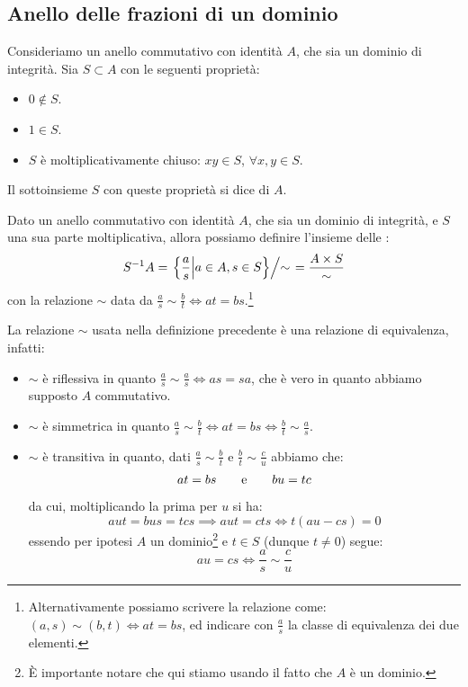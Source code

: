 \documentclass[11pt]{scrartcl}
\begin{document}
\newpage
\subsection{Anello delle frazioni di un dominio}

\begin{definition}
    Consideriamo un anello commutativo con identità $A$, che sia un dominio di integrità. Sia $S \subset A$ con le seguenti proprietà:
    \begin{itemize}
        \item $0 \not\in S$.
        \item $1 \in S$.
        \item $S$ è moltiplicativamente chiuso: $xy \in S$, $\forall x,y \in S$.
    \end{itemize}
    Il sottoinsieme $S$ con queste proprietà si dice  di $A$.
\end{definition}

\begin{definition}
    Dato un anello commutativo con identità $A$, che sia un dominio di integrità, e $S$ una sua parte moltiplicativa, allora possiamo definire l'insieme delle :
    \[ S^{-1}A = \left.\left\{\frac{a}{s} \middle| a\in A, s \in S\right\} \middle/ \sim \right. = \frac{A \times S}{\sim}
        \]
    con la relazione $\sim$ data da $\displaystyle\frac{a}{s} \sim \frac{b}{t} \iff at = bs$.\footnote{Alternativamente possiamo scrivere la relazione come: $(a,s) \sim (b,t) \iff at = bs$, ed indicare con $\displaystyle\frac{a}{s}$ la classe di equivalenza dei due elementi.}
\end{definition}

\begin{remark}
    La relazione $\sim$ usata nella definizione precedente è una relazione di equivalenza, infatti:
    \begin{itemize}
        \item $\sim$ è riflessiva in quanto $\displaystyle\frac{a}{s} \sim \frac{a}{s} \iff as = sa$, che è vero in quanto abbiamo supposto $A$ commutativo.
        \item $\sim$ è simmetrica in quanto $\displaystyle\frac{a}{s} \sim \frac{b}{t} \iff at = bs \iff \frac{b}{t} \sim \frac{a}{s}$.
        \item $\sim$ è transitiva in quanto, dati $\displaystyle\frac{a}{s} \sim \frac{b}{t}$ e $\displaystyle\frac{b}{t} \sim \frac{c}{u}$ abbiamo che:
            \[ at = bs \qquad \text e \qquad bu = tc
                \]
        da cui, moltiplicando la prima per $u$ si ha:
            \[ aut = bus = tcs \implies aut = cts \iff t(au-cs) = 0
                \]
        essendo per ipotesi $A$ un dominio\footnote{È importante notare che qui stiamo usando il fatto che $A$ è un dominio.} e $t \in S$ (dunque $t \ne 0$) segue:
            \[ au = cs \iff \frac{a}{s} \sim \frac{c}{u}
                \]
    \end{itemize}
\end{remark}
\end{document}
